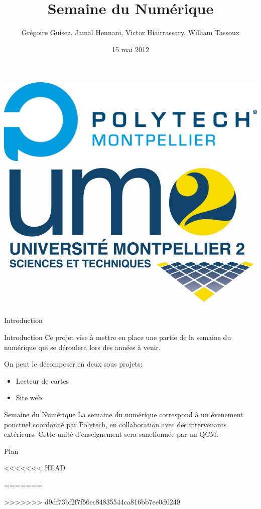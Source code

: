 \documentclass[handout]{beamer}
\title{Semaine du Numérique}
\author[G. Guisez, J. Hennani, V. Hiairrassary, W. Tassoux]{Grégoire Guisez, Jamal Hennani, Victor Hiairrassary, William Tassoux}
\institute{Polytech' Montpellier, Université Montpellier 2}
\date{15 mai 2012}
\begin{document}
\small 



\begin{frame}
    \titlepage

    \includegraphics[scale=0.2]{images/logoPolytech.jpg}
    \hfill
    \hskip8pt
    \includegraphics[scale=0.05]{images/logoUm2.jpg}
\end{frame}


\begin{frame}{Introduction}
    \begin{block}{Introduction}
 		 Ce projet vise à mettre en place une partie de la semaine du numérique qui se déroulera lors des années à venir.

		 On peut le décomposer en deux sous projets:
		\begin{itemize}
			\item Lecteur de cartes
			\item Site web
		\end{itemize}
	\end{block}

	\begin{block}{Semaine du Numérique}
    La semaine du numérique correspond à un évenement ponctuel coordonné
    par Polytech, en collaboration avec des intervenants extérieurs.
    Cette unité d'enseignement sera sanctionnée par un QCM.
	\end{block}	
\end{frame}


\begin{frame}{Plan}
 	\tableofcontents
\end{frame}




<<<<<<< HEAD

=======

>>>>>>> d9df73bf2f7f56ec84835544ca816bb7ee0d0249
\end{document}
